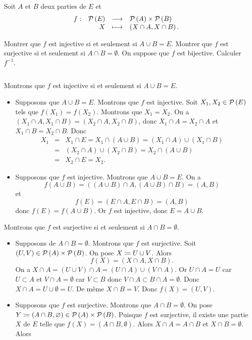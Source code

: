 \documentclass{magnolia}
\begin{document}
Soit $A$ et $B$ deux parties de $E$ et
\[\begin{array}[t]{lrcl} \displaystyle{f} : & \displaystyle{\mathcal{P}\left(E\right)} & \longrightarrow & \displaystyle{\mathcal{P}\left(A\right)\times\mathcal{P}\left(B\right)} \\ & \displaystyle{X} & \longmapsto & \displaystyle{\left(X\cap A,X\cap B\right).} \end{array}\]
\begin{questions}
\question Montrer que $f$ est injective si et seulement si $A\cup B=E$.
\question Montrer que $f$ est surjective si et seulement si $A\cap B=\emptyset$.
\question On suppose que $f$ est bijective. Calculer $f^{-1}$.
\end{questions}
\begin{sol}
$\quad$
\begin{questions}
\question Montrons que $f$ est injective si et seulement si $A\cup B=E$.
  \begin{itemize}
  \item Supposons que $A\cup B=E$. Montrons que $f$ est injective. Soit $X_1,X_2\in\mathcal{P}\left(E\right)$ tels que $f(X_1)=f(X_2)$. Montrons que $X_1=X_2$. On a $(X_1\cap A, X_1\cap B)=(X_2\cap A, X_2\cap B)$, donc $X_1\cap A=X_2\cap A$ et $X_1\cap B=X_2\cap B$. Donc
  \begin{eqnarray*}
  X_1&=&X_1\cap E=X_1\cap(A\cup B)=(X_1\cap A)\cup(X_1\cap B)\\
     &=&(X_2\cap A)\cup(X_2\cap B)=X_2\cap(A\cup B)\\
     &=&X_2\cap E=X_2.
  \end{eqnarray*}
  \item Supposons que $f$ est injective. Montrons que $A\cup B=E$. On a
  \[f(A\cup B)=((A\cup B)\cap A, (A\cup B)\cap B)=(A,B)\]
  et
  \[f(E)=(E\cap A, E\cap B)=(A, B)\]
  donc $f(E)=f(A\cup B)$. Or $f$ est injective, donc $E=A\cup B$.
  \end{itemize}
\question Montrons que $f$ est surjective si et seulement si $A\cap B=\emptyset$.
\begin{itemize}
\item Supposons de $A\cap B=\emptyset$. Montrons que $f$ est surjective. Soit $(U,V)\in\mathcal{P}\left(A\right)\times\mathcal{P}\left(B\right)$. On pose $X\coloneqq U\cup V$. Alors
\[f(X)=(X\cap A, X\cap B).\]
On a $X\cap A=(U\cup V)\cap A=(U\cap A)\cup(V\cap A)$. Or $U\cap A=U$ car $U\subset A$ et $V\cap A=\emptyset$ car $V\subset B$ donc $V\cap A\subset B\cap A=\emptyset$. Donc $X\cap A=U\cup\emptyset=U$. De même $X\cap B=V$. Donc $f(X)=(U, V)$.
\item Supposons que $f$ est surjective. Montrons que $A\cap B=\emptyset$. On pose $Y\coloneqq (A\cap B,\varnothing)\in\mathcal{P}\left(A\right)\times\mathcal{P}\left(B\right)$. Puisque $f$ est surjective, il existe une partie $X$ de $E$ telle que $f(X)=(A\cap B,\emptyset)$. Alors $X\cap A=A\cap B$ et $X\cap B=\emptyset$. Alors

\end{itemize}
\end{questions}
\end{sol}
\end{document}
